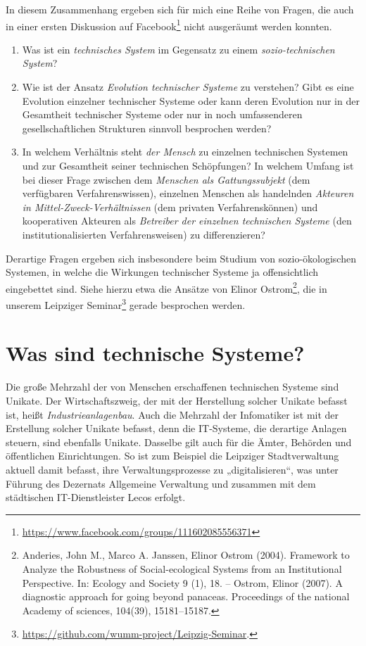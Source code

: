 \documentclass[11pt,a4paper]{article}
\begin{document}
In diesem Zusammenhang ergeben sich für mich eine Reihe von Fragen, die auch
in einer ersten Diskussion auf
Facebook\footnote{\url{https://www.facebook.com/groups/111602085556371}} nicht
ausgeräumt werden konnten.
\begin{enumerate}
\item Was ist ein \emph{technisches System} im Gegensatz zu einem
  \emph{sozio-technischen System}?
\item Wie ist der Ansatz \emph{Evolution technischer Systeme} zu verstehen?
  Gibt es eine Evolution einzelner technischer Systeme oder kann deren
  Evolution nur in der Gesamtheit technischer Systeme oder nur in noch
  umfassenderen gesellschaftlichen Strukturen sinnvoll besprochen werden?
\item In welchem Verhältnis steht \emph{der Mensch} zu einzelnen technischen
  Systemen und zur Gesamtheit seiner technischen Schöpfungen? In welchem
  Umfang ist bei dieser Frage zwischen dem \emph{Menschen als Gattungssubjekt}
  (dem verfügbaren Verfahrenswissen), einzelnen Menschen als handelnden
  \emph{Akteuren in Mittel-Zweck-Verhältnissen} (dem privaten
  Verfahrenskönnen) und kooperativen Akteuren als \emph{Betreiber der
    einzelnen technischen Systeme} (den institutionalisierten
  Verfahrensweisen) zu differenzieren?
\end{enumerate}

Derartige Fragen ergeben sich insbesondere beim Studium von sozio-ökologischen
Systemen, in welche die Wirkungen technischer Systeme ja offensichtlich
eingebettet sind.  Siehe hierzu etwa die Ansätze von Elinor
Ostrom\footnote{Anderies, John M., Marco A. Janssen, Elinor Ostrom (2004).
  Framework to Analyze the Robustness of Social-ecological Systems from an
  Institutional Perspective. In: Ecology and Society 9 (1), 18. -- Ostrom,
  Elinor (2007). A diagnostic approach for going beyond panaceas.  Proceedings
  of the national Academy of sciences, 104(39), 15181--15187.}, die in unserem
Leipziger
Seminar\footnote{\url{https://github.com/wumm-project/Leipzig-Seminar}.}
gerade besprochen werden.

\section{Was sind technische Systeme?}

Die große Mehrzahl der von Menschen erschaffenen technischen Systeme sind
Unikate. Der Wirtschaftszweig, der mit der Herstellung solcher Unikate befasst
ist, heißt \emph{Industrieanlagenbau}. Auch die Mehrzahl der Infomatiker ist
mit der Erstellung solcher Unikate befasst, denn die IT-Systeme, die derartige
Anlagen steuern, sind ebenfalls Unikate.  Dasselbe gilt auch für die Ämter,
Behörden und öffentlichen Einrichtungen. So ist zum Beispiel die Leipziger
Stadtverwaltung aktuell damit befasst, ihre Verwaltungsprozesse zu
„digitalisieren“, was unter Führung des Dezernats Allgemeine Verwaltung und
zusammen mit dem städtischen IT-Dienstleister Lecos erfolgt.
\end{document}
